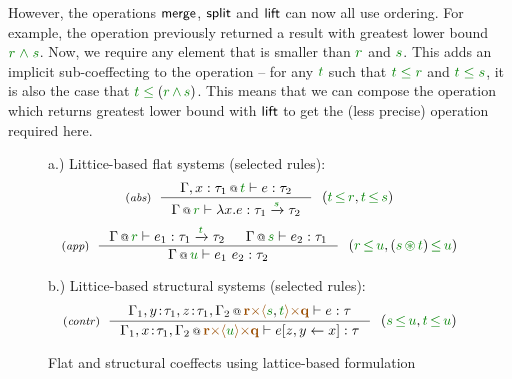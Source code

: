 However, the operations $\textnormal{\sffamily merge}$, $\textnormal{\sffamily split}$ and $\textnormal{\sffamily lift}$ can now all
use ordering. For example, the  operation previously returned
a result with greatest lower bound $\cclrd{r}\;\czip\;\cclrd{s}$. Now, we require any
element that is smaller than $\cclrd{r}$ and $\cclrd{s}$. This adds an implicit sub-coeffecting
to the operation -- for any $\cclrd{t}$ such that $\cclrd{t}\;\cleq\;\cclrd{r}$ and 
$\cclrd{t}\;\cleq\;\cclrd{s}$, it is also the case that $\cclrd{t}\;\cleq\;(\cclrd{r}\,\czip\,\cclrd{s})$.
This means that we can compose the  operation which returns greatest lower
bound with $\textnormal{\sffamily lift}$ to get the (less precise) operation required here.


\begin{figure}[t]
{\small a.) Littice-based flat systems (selected rules):}
\begin{equation*}
\tyrule{abs}
  {\coctx{\Gamma, x:\tau_1}{\cclrd{t}} \vdash e : \tau_2}
  {\coctx{\Gamma}{\cclrd{r}} \vdash \lambda x.e : \tau_1 \xrightarrow{\cclrd{s}} \tau_2 }
~~(\cclrd{t}\,\cleq\,\cclrd{r}, \cclrd{t}\,\cleq\,\cclrd{s})
\end{equation*}
\begin{equation*}
\tyrule{app}
  {\coctx{\Gamma}{\cclrd{r}} \vdash e_1 : \tau_1 \xrightarrow{\cclrd{t}} \tau_2 &
   \coctx{\Gamma}{\cclrd{s}} \vdash e_2 : \tau_1 }
  {\coctx{\Gamma}{\cclrd{u}} \vdash e_1~e_2 : \tau_2}
~~(\cclrd{r}\,\cleq\,\cclrd{u}, (\cclrd{s} \,\cseq\, \cclrd{t})\,\cleq\,\cclrd{u})
\end{equation*}

\vspace{1em}
{\small b.) Littice-based structural systems (selected rules):}
\begin{equation*}
\tyrule{contr}
  {\coctx{\Gamma_1,y\!:\!\tau_1,z\!:\!\tau_1,\Gamma_2}{\aclrd{\textbf{r}} \atimes \alift{\cclrd{s},\cclrd{t}} \atimes \aclrd{\textbf{q}}} \vdash e : \tau}
  {\coctx{\Gamma_1,x\!:\!\tau_1,\Gamma_2}{\aclrd{\textbf{r}} \atimes \alift{\cclrd{u}} \atimes \aclrd{\textbf{q}}} \vdash \subst{e}{z,y}{x} : \tau}
~~(\cclrd{s}\,\cleq\,\cclrd{u}, \cclrd{t}\,\cleq\,\cclrd{u})
\end{equation*}

\caption{Flat and structural coeffects using lattice-based formulation}
\label{fig:unified-lattice-types}
\end{figure}

